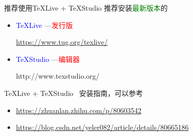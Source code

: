 \documentclass[10pt]{ctexbeamer}
\newcommand{\red}[1]{\textcolor{red}{#1}}
\newcommand{\blue}[1]{\textcolor{blue}{#1}}
\newcommand{\green}[1]{\textcolor{green}{#1}}
\begin{document}
\begin{frame}{推荐使用TeXLive + TeXStudio }
    推荐安装\green{最新版本}的

    \begin{itemize}
        \item \blue{TeXLive}  ---\red{发行版}

        \href{https://www.tug.org/texlive/}{https://www.tug.org/texlive/}



        \item \blue{TeXStudio}    ---\red{编辑器}

        http://www.texstudio.org/
    \end{itemize}

    {TeXLive} + {TeXStudio}   ~安装指南，可以参考
    \begin{itemize}
        \item 	\href{https://zhuanlan.zhihu.com/p/80603542}{https://zhuanlan.zhihu.com/p/80603542}
        \item \href{https://blog.csdn.net/yeler082/article/details/80665186}{https://blog.csdn.net/yeler082/article/details/80665186}
    \end{itemize}
\end{frame}
\end{document}
